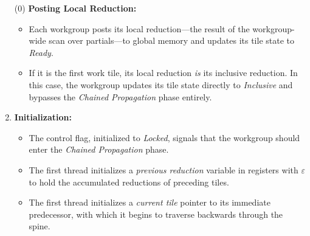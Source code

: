 \documentclass[acmsmall, manuscript, screen, review, anonymous]{acmart}
\begin{document}
\begin{enumerate}
  \item[(0)] \textbf{Posting Local Reduction:}
        \begin{itemize}
          \item Each workgroup posts its local reduction---the result of the workgroup-wide scan over partials---to global memory and updates its tile state to \emph{Ready}.
          \item If it is the first work tile, its local reduction \emph{is} its inclusive reduction. In this case, the workgroup updates its tile state directly to \emph{Inclusive} and bypasses the \emph{Chained Propagation} phase entirely.
        \end{itemize}

  \item \textbf{Initialization:}
        \begin{itemize}
          \item The control flag, initialized to \emph{Locked}, signals that the workgroup should enter the \emph{Chained Propagation} phase.
          \item The first thread initializes a \emph{previous reduction} variable in registers with $\varepsilon$ to hold the accumulated reductions of preceding tiles.
          \item The first thread initializes a \emph{current tile} pointer to its immediate predecessor, with which it begins to traverse backwards through the spine.
        \end{itemize}


\end{enumerate}
\end{document}
